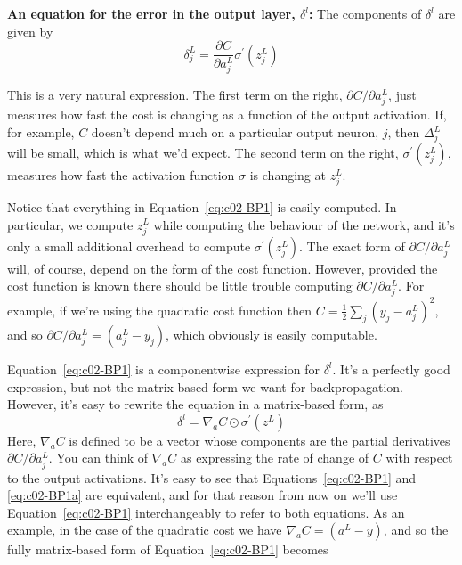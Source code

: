\textbf{An equation for the error in the output layer, $\delta^{l}$:} The components of $\delta^{l}$ are given by 
\begin{equation}
\delta_{j}^{L}=\frac{\partial C}{\partial a_{j}^{L}} \sigma^{\prime}\left(z_{j}^{L}\right)
\label{eq:c02-BP1}
\end{equation}

This is a very natural expression. The first term on the right, $\partial C / \partial a_{j}^{L}$, just measures how fast the cost is changing as a function of the  output activation. If, for example, $C$ doesn't depend much on a particular output neuron, $j$, then $\Delta_{j}^{L}$ will be small, which is what we'd expect. The second term on the right, $\sigma^{\prime}\left(z_{j}^{L}\right)$, measures how fast the activation function $\sigma$  is changing at $z_{j}^{L}$.

Notice that everything in Equation~\ref{eq:c02-BP1} is easily computed. In particular, we compute $z_{j}^{L}$ while computing the behaviour of the network, and it's only a small additional overhead to compute $\sigma^{\prime}\left(z_{j}^{L}\right)$. The exact form of $\partial C / \partial a_{j}^{L}$ will, of course, depend on the form of the cost function. However, provided the cost function is known there should be little trouble computing  $\partial C / \partial a_{j}^{L}$. For example, if we're using the quadratic cost function then $C=\frac{1}{2} \sum_{j}\left(y_{j}-a_{j}^{L}\right)^{2}$, and so $\partial C / \partial a_{j}^{L}=\left(a_{j}^{L}-y_{j}\right)$, which obviously is easily computable.

Equation~\ref{eq:c02-BP1} is a componentwise expression for  $\delta^{l}$. It's a perfectly good expression, but not the matrix-based form we want for backpropagation. However, it's easy to rewrite the equation in a matrix-based form, as 
\begin{equation}
\delta^{l}=\nabla_{a} C \odot \sigma^{\prime}\left(z^{L}\right)
\label{eq:c02-BP1a}
\end{equation}
Here, $\nabla_a C$ is defined to be a vector whose components are the partial derivatives $\partial C / \partial a_{j}^{L}$. You can think of $\nabla_a C$  as expressing the rate of change of $C$ with respect to the output activations. It's easy to see that Equations~\ref{eq:c02-BP1} and \ref{eq:c02-BP1a} are equivalent, and for that reason from now on we'll use Equation~\ref{eq:c02-BP1} interchangeably to refer to both equations. As an example, in the case of the quadratic cost we have $\nabla_{a} C=\left(a^{L}-y\right)$, and so the fully matrix-based form of Equation~\ref{eq:c02-BP1} becomes 

